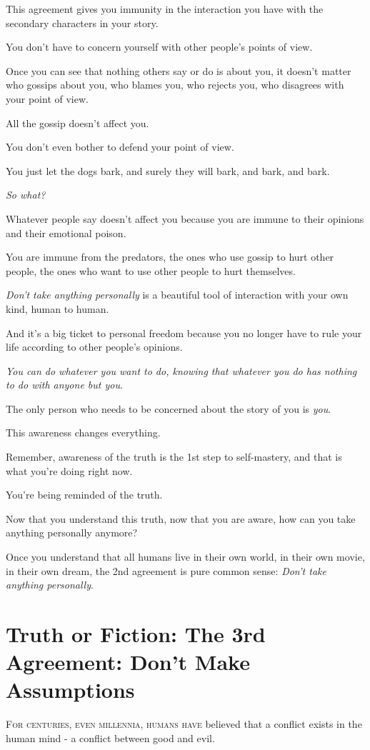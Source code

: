 \documentclass{article}
\numberwithin{equation}{section}
\begin{document}
This agreement gives you immunity in the interaction you have with the secondary characters in your story.

You don't have to concern yourself with other people's points of view.

Once you can see that nothing others say or do is about you, it doesn't matter who gossips about you, who blames you, who rejects you, who disagrees with your point of view.

All the gossip doesn't affect you.

You don't even bother to defend your point of view.

You just let the dogs bark, and surely they will bark, and bark, and bark.

\textit{So what?}

Whatever people say doesn't affect you because you are immune to their opinions and their emotional poison.

You are immune from the predators, the ones who use gossip to hurt other people, the ones who want to use other people to hurt themselves.

%
\textit{Don't take anything personally} is a beautiful tool of interaction with your own kind, human to human.

And it's a big ticket to personal freedom because you no longer have to rule your life according to other people's opinions.


\textit{You can do whatever you want to do, knowing that whatever you do has nothing to do with anyone but you}.

The only person who needs to be concerned about the story of you is \textit{you}.

This awareness changes everything.

Remember, awareness of the truth is the 1st step to self-mastery, and that is what you're doing right now.

You're being reminded of the truth.

%
Now that you understand this truth, now that you are aware, how can you take anything personally anymore?

Once you understand that all humans live in their own world, in their own movie, in their own dream, the 2nd agreement is pure common sense: \textit{Don't take anything personally}.

\section{Truth or Fiction: The 3rd Agreement: Don't Make Assumptions}
\textsc{For centuries, even millennia, humans have} believed that a conflict exists in the human mind - a conflict between good and evil.
\end{document}
